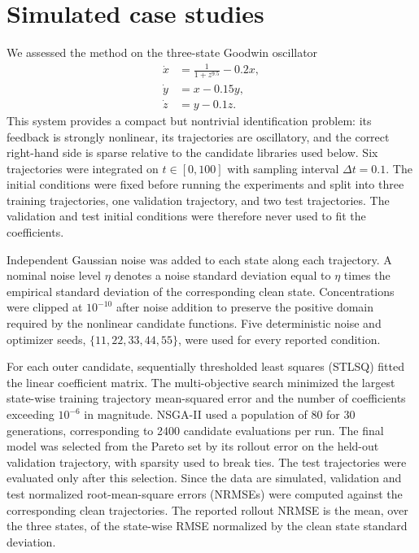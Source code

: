
\section{Simulated case studies}
\label{sec:results-goodwin}

We assessed the method on the three-state Goodwin oscillator
\begin{align}
    \dot{x} &= \frac{1}{1+z^{9.5}}-0.2x, \\
    \dot{y} &= x-0.15y, \\
    \dot{z} &= y-0.1z.
    \label{eq:goodwin-ground-truth}
\end{align}
This system provides a compact but nontrivial identification problem: its
feedback is strongly nonlinear, its trajectories are oscillatory, and the
correct right-hand side is sparse relative to the candidate libraries used
below.  Six trajectories were integrated on $t\in[0,100]$ with sampling
interval $\Delta t=0.1$.  The initial conditions were fixed before running the
experiments and split into three training trajectories, one validation
trajectory, and two test trajectories.  The validation and test initial
conditions were therefore never used to fit the coefficients.

Independent Gaussian noise was added to each state along each trajectory.  A
nominal noise level $\eta$ denotes a noise standard deviation equal to
$\eta$ times the empirical standard deviation of the corresponding clean
state.  Concentrations were clipped at $10^{-10}$ after noise addition to
preserve the positive domain required by the nonlinear candidate functions.
Five deterministic noise and optimizer seeds, $\{11,22,33,44,55\}$, were used
for every reported condition.

For each outer candidate, sequentially thresholded least squares (STLSQ) fitted
the linear coefficient matrix.  The multi-objective search minimized the
largest state-wise training trajectory mean-squared error and the number of
coefficients exceeding $10^{-6}$ in magnitude.  NSGA-II used a population of
80 for 30 generations, corresponding to 2400 candidate evaluations per run.
The final model was selected from the Pareto set by its rollout error on the
held-out validation trajectory, with sparsity used to break ties.  The test
trajectories were evaluated only after this selection.  Since the data are
simulated, validation and test normalized root-mean-square errors (NRMSEs) were
computed against the corresponding clean trajectories.  The reported rollout
NRMSE is the mean, over the three states, of the state-wise RMSE normalized by
the clean state standard deviation.

